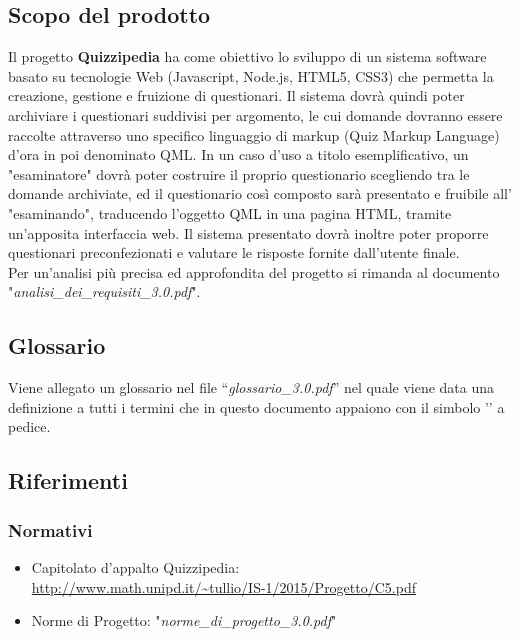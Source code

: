 \documentclass[a4paper,11pt]{article}
\begin{document}
	\subsection{Scopo del prodotto}
	Il progetto \textbf{Quizzipedia} ha come obiettivo lo sviluppo di un sistema software basato su tecnologie Web (Javascript\addglos, Node.js\addglos, HTML5\addglos, CSS3\addglos) che permetta la creazione, gestione e fruizione di questionari. Il sistema dovrà quindi poter archiviare i questionari suddivisi per argomento, le cui domande dovranno essere raccolte attraverso uno specifico linguaggio di markup (Quiz Markup Language) d'ora in poi denominato QML\addglos. In un caso d'uso a titolo esemplificativo, un "esaminatore" dovrà poter costruire il proprio questionario scegliendo tra le domande archiviate, ed il questionario così composto sarà presentato e fruibile all' "esaminando", traducendo l'oggetto QML in una pagina HTML\addglos, tramite un'apposita interfaccia web. Il sistema presentato dovrà inoltre poter proporre questionari preconfezionati e valutare le risposte fornite dall'utente finale.
	\\
	Per un'analisi più precisa ed approfondita del progetto si rimanda al documento\\ "\textit{analisi\_dei\_requisiti\_3.0.pdf}".
	\subsection{Glossario}
	Viene allegato un glossario nel file ``\textit{glossario\_3.0.pdf}'' nel quale viene data una definizione a tutti i termini che in questo documento appaiono con il simbolo '\addglos' a pedice.
	\subsection{Riferimenti}
		\subsubsection{Normativi}

		\begin{itemize}
			\item Capitolato d'appalto Quizzipedia:\\
			\url{http://www.math.unipd.it/~tullio/IS-1/2015/Progetto/C5.pdf}
			\item Norme di Progetto: "\textit{norme\_di\_progetto\_3.0.pdf}"
		\end{itemize}
\end{document}
